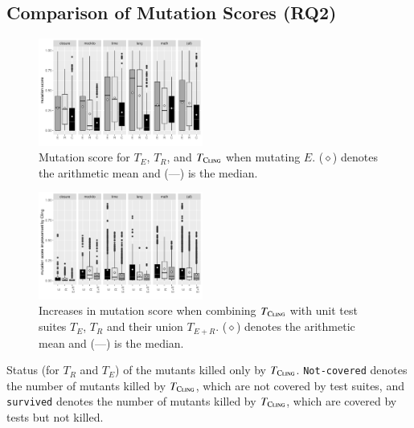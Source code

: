 \subsection{Comparison of Mutation Scores (RQ2)}
 
 
\begin{figure}[t]
    \centering
    \includegraphics[width=0.48\textwidth]{papers/cling/figures/mutation-coverage-boxplot.pdf}
    \caption{Mutation score for $T_E$, $T_R$, and $T_\textsc{Cling}$ when mutating $E$. ($\diamond$) denotes the arithmetic mean and (---) is the median.}
    \label{fig:mutation:boxplot}
\end{figure}

\begin{figure}[t]
    \centering
    \includegraphics[width=0.48\textwidth]{papers/cling/figures/mutation-diff-boxplot.pdf}
    \caption{Increases in mutation score when combining $T_\textsc{Cling}$ with unit test suites $T_E$, $T_R$ and their union $T_{E+R}$. ($\diamond$) denotes the arithmetic mean and (---) is the median.}
    \label{fig:mutation:diff:boxplot} 
\end{figure}

\begin{table} [t]
	\center
    \caption{Status (for $T_R$ and $T_E$) of the mutants killed only by $T_{\textsc{Cling}}$. \texttt{Not-covered} denotes the number of mutants killed by $T_{\textsc{Cling}}$, which are not covered by \evosuite test suites, and \texttt{survived} denotes the number of mutants killed by $T_{\textsc{Cling}}$, which are covered by \evosuite tests but not killed.}
	\label{tab:mutant-status-table}
	
\end{table} 



